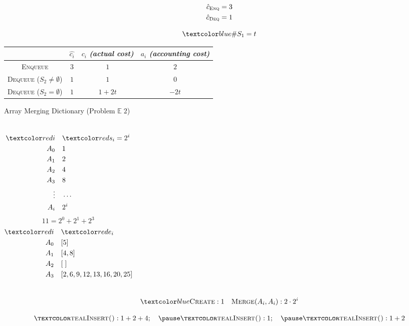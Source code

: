 \begin{frame}{}
  \centerline{}

  \begin{align*}
    \hat{c}_{\textsc{Enq}} &= 3 \\
    \hat{c}_{\textsc{Deq}} &= 1 \\
  \end{align*}

  \vspace{-0.60cm}
  \[
	\blue{\#S_1 = t}
  \]

  \begin{table}
    \begin{tabular}{c|ccc}
      & $\hat{c_i}$ & $c_i$ {\it (actual cost)} & $a_i$ {\it (accounting cost)} \\ \hline
      \textsc{Enqueue} & $3$ & $1$ & $2$ \\
      \textsc{Dequeue} ($S_2 \neq \emptyset$) & $1$ & $1$ & $0$ \\
      \textsc{Dequeue} ($S_2 = \emptyset$) & $1$ & $1+2t$ & $-2t$
    \end{tabular}
  \end{table}
\end{frame}

\begin{frame}{}
  \begin{exampleblock}{Array Merging Dictionary (Problem $\mathbb{E}\; 2$)}
    \begin{columns}
        \pause
		\begin{align*}
		  \red{i} & \quad \red{s_i = 2^i} \\
		  A_{0} & \quad 1 \\
		  A_{1} & \quad 2 \\
		  A_{2} & \quad 4 \\
		  A_{3} & \quad 8 \\
		  \vdots & \quad \cdots \\
		  A_{i} & \quad 2^{i}
		\end{align*}
        \pause
        \[
		  11 = 2^{0} + 2^{1} + 2^{3} 
		\]
	\begin{align*}
	  \red{i} & \quad \red{e_i} \\
	  A_{0} & \quad [5] \\
	  A_{1} & \quad [4,8] \\
	  A_{2} & \quad [\;] \\
	  A_{3} & \quad [2, 6, 9, 12, 13, 16, 20, 25]
	\end{align*}
  \end{columns}
    
  \pause
  \vspace{0.30cm}
  \[
	\blue{\textsc{Create}: 1 \quad \textsc{Merge$(A_i, A_i)$}: 2 \cdot 2^i}
  \]
  \end{exampleblock}

  \pause
  \[
    \textsc{\teal{Insert()}}: 1 + 2 + 4; \quad \pause \textsc{\teal{Insert()}}: 1; \quad \pause \textsc{\teal{Insert()}}: 1 + 2
  \]
\end{frame}

